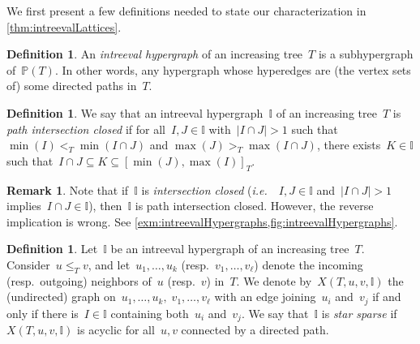 \documentclass{amsart}
\theoremstyle{definition}
\newtheorem{definition}[theorem]{Definition}
\newtheorem{remark}[theorem]{Remark}
\newcommand{\ie}{\textit{i.e.}~} %
\newcommand{\darkblue}{\color{darkblue}} %
\newcommand{\defn}[1]{\textsl{\darkblue #1}} %
\newcommand{\II}{\mathbb I} %
\newcommand{\PP}{\mathbb P} %
\begin{document}
We first present a few definitions needed to state our characterization in \cref{thm:intreevalLattices}.

\begin{definition}
An \defn{intreeval hypergraph} of an increasing tree~$T$ is a subhypergraph of~$\PP(T)$.
In other words, any hypergraph whose hyperedges are (the vertex sets of) some directed paths in~$T$.
\end{definition}

\begin{definition} 
\label{def:pathIntersectionClose}
We say that an intreeval hypergraph~$\II$ of an increasing tree~$T$ is \defn{path intersection closed} if for all~$I,J\in \II$ with~$|I\cap J|> 1$ such that $\min(I) <_T \min(I\cap J)$ and  $\max(J) >_T \max(I\cap J)$, there exists~$K \in \II$ such that~$I \cap J \subseteq K \subseteq [\min(J) , \max(I)]_T$. %
\end{definition}

\begin{remark}
Note that if~$\II$ is \defn{intersection closed} (\ie~$I , J \in \II$ and~$|I \cap J| > 1$ implies~$I \cap J \in \II$), then~$\II$ is path intersection closed.
However, the reverse implication is wrong.
See \cref{exm:intreevalHypergraphs,fig:intreevalHypergraphs}.
\end{remark}

\begin{definition}
\label{def:pathStarSparse}
Let~$\II$ be an intreeval hypergraph of an increasing tree~$T$.
Consider~$u \le_T v$, and let~$u_1, \dots, u_k$ (resp.~$v_1, \dots, v_\ell$) denote the incoming (resp.~outgoing) neighbors of~$u$ (resp.~$v$) in~$T$.
We denote by~$X(T,u,v,\II)$ the (undirected) graph on~$u_1, \dots, u_k,\; v_1, \dots, v_\ell$ with an edge joining~$u_i$ and~$v_j$ if and only if there is~$I \in \II$ containing both~$u_i$ and~$v_j$.
We say that~$\II$ is \defn{star sparse} if~$X(T,u,v,\II)$ is acyclic for all~$u,v$ connected by a directed path.
\end{definition}
\end{document}
